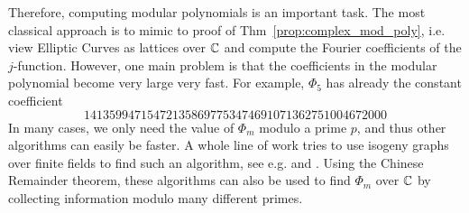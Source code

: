Therefore, computing modular polynomials is an important task.
The most classical approach is to mimic to proof of Thm~\ref{prop:complex_mod_poly}, i.e. view Elliptic Curves as lattices over $\mathbb{C}$ and compute the Fourier coefficients of the $j$-function.
However, one main problem is that the coefficients in the modular polynomial become very large very fast.
For example, $\Phi_5$ has already the constant coefficient
\begin{equation*}
    141359947154721358697753474691071362751004672000
\end{equation*}
In many cases, we only need the value of $\Phi_m$ modulo a prime $p$, and thus other algorithms can easily be faster.
A whole line of work tries to use isogeny graphs over finite fields to find such an algorithm, see e.g. \cite{compute_modular_polynomial} and \cite{compute_modular_polynomial2}.
Using the Chinese Remainder theorem, these algorithms can also be used to find $\Phi_m$ over $\mathbb{C}$ by collecting information modulo many different primes.
